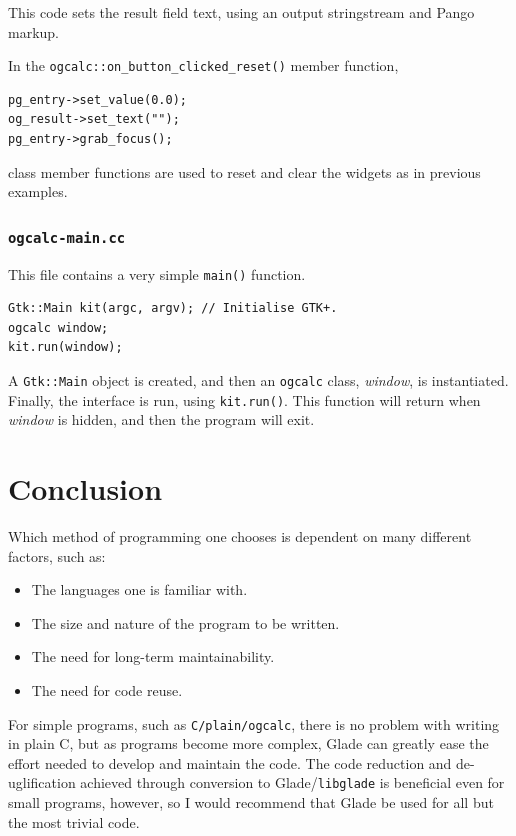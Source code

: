 \documentclass[a4paper,oneside]{article}
\newcommand{\filename}[1]{\texttt{#1}}
\newcommand{\program}[1]{\texttt{#1}}
\newcommand{\variable}[1]{\textsl{#1}}
\newcommand{\class}[1]{\texttt{#1}}
\newcommand{\function}[1]{\texttt{#1()}}
\newcommand{\code}[1]{\texttt{#1}}
\begin{document}
This code sets the result field text, using an output stringstream and
Pango markup.

In the \function{ogcalc::on\_button\_clicked\_reset} member function,

\begin{lstlisting}[numbers=none, language={[GNU]C++}]
pg_entry->set_value(0.0);
og_result->set_text("");
pg_entry->grab_focus();
\end{lstlisting}

\noindent class member functions are used to reset and clear the
widgets as in previous examples.

\subsubsection{\filename{ogcalc-main.cc}}

This file contains a very simple \function{main} function.

\begin{lstlisting}[numbers=none, language={[GNU]C++}]
Gtk::Main kit(argc, argv); // Initialise GTK+.
ogcalc window;
kit.run(window);
\end{lstlisting}

A \class{Gtk::Main} object is created, and then an \class{ogcalc}
class, \variable{window}, is instantiated.  Finally, the interface is
run, using \code{kit.run()}.  This function will return when
\variable{window} is hidden, and then the program will exit.

\section{Conclusion}

Which method of programming one chooses is dependent on many different
factors, such as:

\begin{itemize}
\item{The languages one is familiar with.}
\item{The size and nature of the program to be written.}
\item{The need for long-term maintainability.}
\item{The need for code reuse.}
\end{itemize}

For simple programs, such as \program{C/plain/ogcalc}, there is no
problem with writing in plain C, but as programs become more complex,
Glade can greatly ease the effort needed to develop and maintain the
code.  The code reduction and de-uglification achieved through
conversion to Glade/\program{libglade} is beneficial even for small
programs, however, so I would recommend that Glade be used for all but
the most trivial code.
\end{document}
